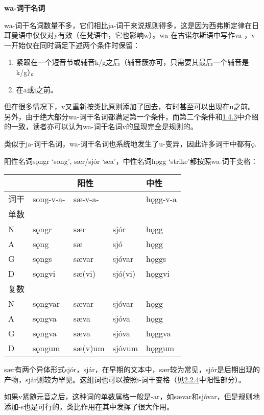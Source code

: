 \textbf{wa-词干名词}

wa-词干名词数量不多，它们相比ja-词干来说规则得多，这是因为西弗斯定律在日耳曼语中仅仅对y有效（在梵语中，它也影响w）。wa-在古诺尔斯语中写作va-，v一开始仅在同时满足下述两个条件时保留：

\begin{enumerate}
\def\labelenumi{\arabic{enumi})}
\item
  紧跟在一个短音节或辅音k/g之后（辅音簇亦可，只需要其最后一个辅音是k/g）。
\item
  在a或i之前。
\end{enumerate}

但在很多情况下，v又重新按类比原则添加了回去，有时甚至可以出现在u之前。另外，由于绝大部分wa-词干名词都满足第一个条件，而第二个条件和\hyperref[ux534aux5143ux97f3ux7684ux4fddux6301ux6027]{1.4.3}中介绍的一致，读者亦可以认为wa-词干名词v的显现完全是规则的。

类似于ja-词干名词，wa-词干名词也系统地发生了u-变异，因此许多词干中都有ǫ.

阳性名词sǫngr `song', sær/sjór `sea'，中性名词hǫgg
`strike'都按照wa-词干变格：

\begin{longtable}{lllll}
\toprule
 &\multicolumn{3}{c}{阳性} & 中性 \\
\midrule
\endhead
\bottomrule
\endfoot
词干 & song-v-a- & sæ-v-a- & & hǫgg-v-a \\
单数 & & & & \\
N & sǫngr & sær & sjór & hǫgg \\
A & sǫng & sæ & sjó & hǫgg \\
G & sǫngs & sævar & sjóvar & hǫggs \\
D & sǫngvi & sæ(vi) & sjó(vi) & hǫggvi \\
复数 & & & & \\
N & sǫngvar & sævar & sjóvar & hǫgg \\
A & sǫngva & sæva & sjóva & hǫgg \\
G & sǫngva & sæva & sjóva & hǫggva \\
D & sǫngum & sæ(v)um & sjóvum & hǫggum \\
\end{longtable}

sær有两个异体形式sjór，sjár，在早期的文本中，sær较为常见，sjór是后期出现的产物，sjár则较为罕见。这组词也可以按照i-词干变格（见\hyperref[_Ref115770706]{2.2.4}中阳性部分）。

如果v紧随元音之后，这种词的单数属格一般是-ar，如sævar和sjóvar，但是规则地添加-s也是可行的，类比作用在其中发挥了很大作用。

